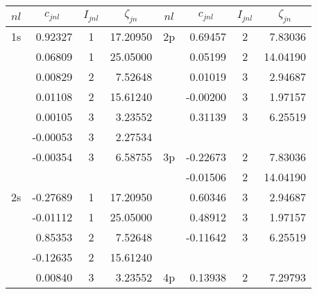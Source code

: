 %
\begin{table}[hbt]
\footnotesize
\begin{center}
\begin{tabular}{@{}        l r c r     |      l r c r        @{}}
\toprule
\multicolumn{1}{c}{$nl$} & \multicolumn{1}{c}{$c_{jnl}$} & \multicolumn{1}{c}{$I_{jnl}$} & \multicolumn{1}{c}{$\zeta_{jn}$} & \multicolumn{1}{c}{$nl$} & \multicolumn{1}{c}{$c_{jnl}$} & \multicolumn{1}{c}{$I_{jnl}$} & \multicolumn{1}{c}{$\zeta_{jn}$} \\  

\toprule
                                            
                                           
 \multicolumn{1}{c}{1s} &  0.92327    &   1   &    17.20950     & 2p  &     0.69457  &      2     &   7.83036 \\
                  &        0.06809     &     1     &  25.05000    &  &   0.05199     &       2    &   14.04190\\
                  &        0.00829     &    2    &    7.52648    &  &   0.01019        &        3     &   2.94687\\
                  &        0.01108     &      2    &   15.61240    &  &   -0.00200         &        3     &   1.97157\\
                  &        0.00105     &           3   &     3.23552    &  &   0.31139         &        3     &   6.25519\\
                   &      -0.00053     &         3     &   2.27534    & & & &\\
                   &      -0.00354     &         3    &    6.58755    & 3p  &   -0.22673        &        2     &   7.83036 \\
                   &                          &      &    &  &   -0.01506       &       2     &  14.04190    \\
  \multicolumn{1}{c}{2s}           &              -0.27689     &       1    &   17.20950    &  &   0.60346        &       3     &   2.94687\\
                &         -0.01112     &        1   &    25.05000    &  &   0.48912       &        3    &    1.97157\\
                &          0.85353     &           2   &     7.52648    &  &   -0.11642      &        3     &   6.25519\\
               &          -0.12635     &         2    &   15.61240    & & & &\\
                &          0.00840     &         3    &    3.23552    & 4p  &   0.13938        &    2   &     7.29793 \\

\end{tabular}
\end{center}
\end{table}
